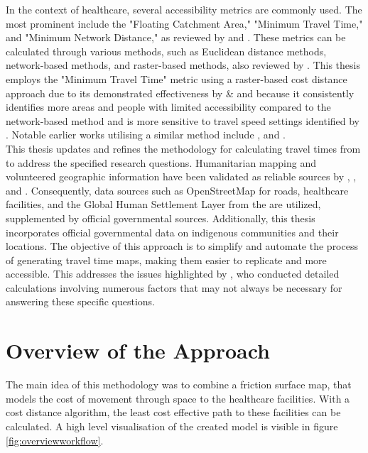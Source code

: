 \documentclass[11pt, a4paper]{report}
\begin{document}
In the context of healthcare, several accessibility metrics are commonly used. The most prominent include the "Floating Catchment Area," "Minimum Travel Time," and "Minimum Network Distance," as reviewed by \citet{neutens_accessibility_2015} and \cite{mark_f_guagliardo_spatial_2004}. These metrics can be calculated through various methods, such as Euclidean distance methods, network-based methods, and raster-based methods, also reviewed by \citet{neutens_accessibility_2015}. This thesis employs the "Minimum Travel Time" metric using a raster-based cost distance approach due to its demonstrated effectiveness by \cite{neutens_accessibility_2015} \& \cite{fortney_phd_comparing_2000} and because it consistently identifies more areas and people with limited accessibility compared to the network-based method and is more sensitive to travel speed settings identified by \cite{delamater_measuring_2012}. Notable earlier works utilising a similar method include \citet{tanser_modelling_2006}, \cite{brabyn_modeling_2002}  and \citet{weiss_global_2020}.\\
%
This thesis updates and refines the methodology for calculating travel times from \citet{weiss_global_2020} to address the specified research questions. Humanitarian mapping and volunteered geographic information have been validated as reliable sources by \cite{goodchild_citizens_2007}, \cite{barron_comprehensive_2014}, and \cite{herfort_evolution_2021}. Consequently, data sources such as OpenStreetMap for roads, healthcare facilities, and the Global Human Settlement Layer from the \citet{european_commission_joint_research_centre_global_2021} are utilized, supplemented by official governmental sources. Additionally, this thesis incorporates official governmental data on indigenous communities and their locations. The objective of this approach is to simplify and automate the process of generating travel time maps, making them easier to replicate and more accessible. This addresses the issues highlighted by \citet{weiss_global_2020}, who conducted detailed calculations involving numerous factors that may not always be necessary for answering these specific questions.

\section{Overview of the Approach}
The main idea of this methodology was to combine a friction surface map, that models the cost of movement through space to the healthcare facilities. With a cost distance algorithm, the least cost effective path to these facilities can be calculated. A high level visualisation of the created model is visible in figure \ref{fig:overviewworkflow}. 
\end{document}
